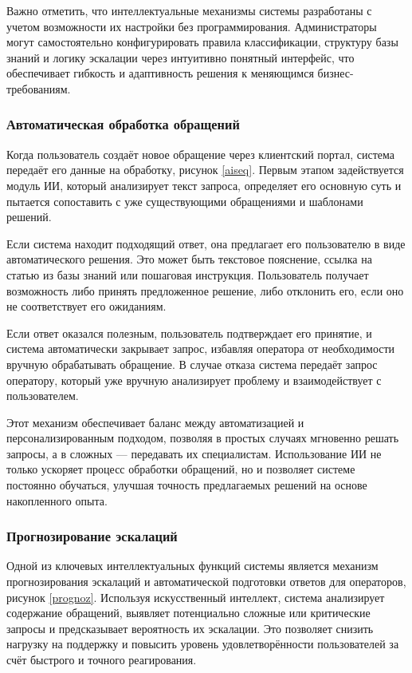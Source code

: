 Важно отметить, что интеллектуальные механизмы системы разработаны с учетом возможности их настройки без программирования. Администраторы могут самостоятельно конфигурировать правила классификации, структуру базы знаний и логику эскалации через интуитивно понятный интерфейс, что обеспечивает гибкость и адаптивность решения к меняющимся бизнес-требованиям.

\subsubsection{Автоматическая обработка обращений}

Когда пользователь создаёт новое обращение через клиентский портал, система передаёт его данные на обработку, рисунок \ref{aiseq}. Первым этапом задействуется модуль ИИ, который анализирует текст запроса, определяет его основную суть и пытается сопоставить с уже существующими обращениями и шаблонами решений.


Если система находит подходящий ответ, она предлагает его пользователю в виде автоматического решения. Это может быть текстовое пояснение, ссылка на статью из базы знаний или пошаговая инструкция. Пользователь получает возможность либо принять предложенное решение, либо отклонить его, если оно не соответствует его ожиданиям.

Если ответ оказался полезным, пользователь подтверждает его принятие, и система автоматически закрывает запрос, избавляя оператора от необходимости вручную обрабатывать обращение. В случае отказа система передаёт запрос оператору, который уже вручную анализирует проблему и взаимодействует с пользователем.

Этот механизм обеспечивает баланс между автоматизацией и персонализированным подходом, позволяя в простых случаях мгновенно решать запросы, а в сложных — передавать их специалистам. Использование ИИ не только ускоряет процесс обработки обращений, но и позволяет системе постоянно обучаться, улучшая точность предлагаемых решений на основе накопленного опыта.

\subsubsection{Прогнозирование эскалаций}

Одной из ключевых интеллектуальных функций системы является механизм прогнозирования эскалаций и автоматической подготовки ответов для операторов, рисунок \ref{prognoz}. Используя искусственный интеллект, система анализирует содержание обращений, выявляет потенциально сложные или критические запросы и предсказывает вероятность их эскалации. Это позволяет снизить нагрузку на поддержку и повысить уровень удовлетворённости пользователей за счёт быстрого и точного реагирования.

